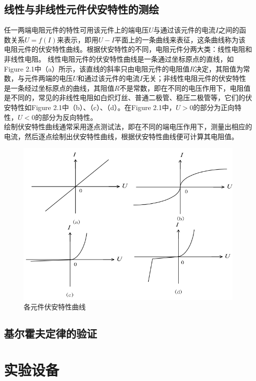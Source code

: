\documentclass{article}
\begin{document}
\subsection{线性与非线性元件伏安特性的测绘}
\hspace*{2em}任一两端电阻元件的特性可用该元件上的端电压\(U\)与通过该元件的电流\(I\)之间的函数关系\(U = f(I)\)来表示，即用\(U - I\)平面上的一条曲线来表征，这条曲线称为该电阻元件的伏安特性曲线。根据伏安特性的不同，电阻元件分两大类：线性电阻和非线性电阻。
线性电阻元件的伏安特性曲线是一条通过坐标原点的直线，如Figure 2.1中（a）所示，该直线的斜率只由电阻元件的电阻值\(R\)决定，其阻值为常数，与元件两端的电压\(U\)和通过该元件的电流\(I\)无关；非线性电阻元件的伏安特性是一条经过坐标原点的曲线，其阻值\(R\)不是常数，即在不同的电压作用下，电阻值是不同的，常见的非线性电阻如白炽灯丝、普通二极管、稳压二极管等，它们的伏安特性如Figure 2.1中（b）、（c）、（d）。在Figure 2.1中，\(U>0\)的部分为正向特性，\(U < 0\)的部分为反向特性。\\
\hspace*{2em}绘制伏安特性曲线通常采用逐点测试法，即在不同的端电压作用下，测量出相应的电流，然后逐点绘制出伏安特性曲线，根据伏安特性曲线便可计算其电阻值。
\begin{figure}[h]
    \centering
    \includegraphics[width=13cm]{1.1.png} 
    \caption{各元件伏安特性曲线}
\end{figure}

\subsection{基尔霍夫定律的验证}

\section{实验设备}
\end{document}
